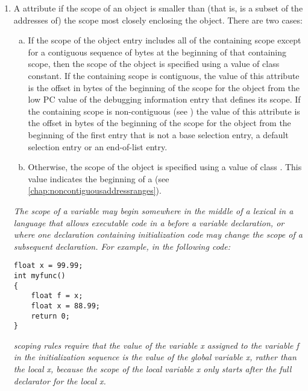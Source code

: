 \begin{enumerate}[1. ]
\item A \DWATstartscope{} 
attribute if the scope of 
an
\hypertarget{chap:DWATstartscopeobjectdeclaration}{}
object is smaller than (that is, is a subset of the addresses
of) the scope most closely enclosing the object. There are
two cases:
\begin{enumerate}[a) ]
\item If the scope of the object entry includes all of the
containing scope except for a contiguous sequence of bytes at
the beginning of that containing scope, then the scope of the
object is specified using a value of class constant. If the
containing scope is contiguous, the value of this attribute
is the offset in bytes of the beginning of the scope for the
object from the low PC value of the debugging information
entry that defines its scope. If the containing scope
is non-contiguous 
(see )
the value of this
attribute is the offset in bytes of the beginning of the scope
for the object from the beginning of the first  entry
that is not a base selection entry, a default selection entry or an end-of-list entry.

\item Otherwise, the scope of the object is specified using
a value of class . 
This value indicates the
beginning of a 
(see \ref{chap:noncontiguousaddressranges}).
\end{enumerate}


\textit{The scope of a variable may begin somewhere in the middle of
a lexical  in a language 
that allows executable code in a
 before a variable declaration, or where one declaration
containing initialization code may change the scope of a
subsequent declaration.  For example, in the following  code:}

\begin{lstlisting}
float x = 99.99;
int myfunc()
{
    float f = x;
    float x = 88.99;
    return 0;
}
\end{lstlisting}

\textit{ scoping rules require that the value of the variable x
assigned to the variable f in the initialization sequence is
the value of the global variable x, rather than the local x,
because the scope of the local variable x only starts after
the full declarator for the local x.}


\end{enumerate}
